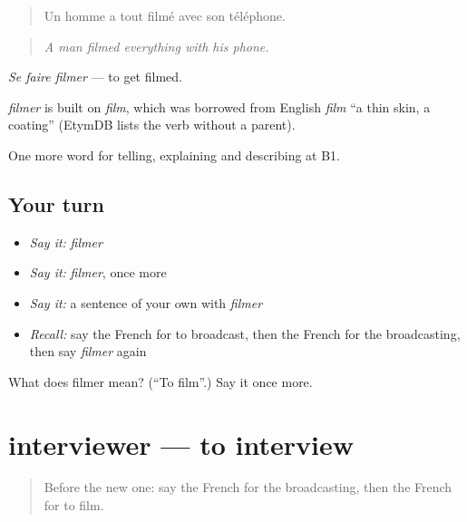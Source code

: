 \begin{quote}
Un homme a tout filmé avec son téléphone.
\end{quote}

\begin{quote}
\emph{A man filmed everything with his phone.}
\end{quote}

\emph{Se faire filmer} — to get filmed.

\begin{cousinweb}
\emph{filmer} is built on \emph{film}, which was borrowed from English \emph{film} \textquotedblleft{}a thin skin, a coating\textquotedblright{} (EtymDB lists the verb without a parent).
\end{cousinweb}

\begin{grammarlens}[title={What you've built}]
One more word for telling, explaining and describing at B1.
\end{grammarlens}

\subsection*{Your turn}
\begin{itemize}
\raggedright
  \item \emph{Say it:} \emph{filmer}
  \item \emph{Say it:} \emph{filmer}, once more
  \item \emph{Say it:} a sentence of your own with \emph{filmer}
  \item \emph{Recall:} say the French for to broadcast, then the French for the broadcasting, then say \emph{filmer} again
\end{itemize}

\begin{tcolorbox}[breakable,colback=teal!4,colframe=teal!35!black,title={Before you move on}]
What does filmer mean? (\textquotedblleft{}To film\textquotedblright{}.) Say it once more.
\end{tcolorbox}
\section[interviewer]{interviewer — to interview}

\label{lesson:FR-C283-interviewer}



\begin{quote}
Before the new one: say the French for the broadcasting, then the French for to film.
\end{quote}

